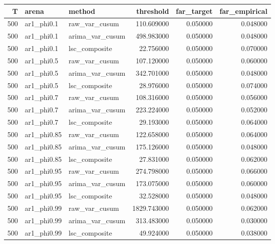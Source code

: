 \begin{tabular}{rllrrr}
\toprule
T & arena & method & threshold & far_target & far_empirical \\
\midrule
500 & ar1_phi0.1 & raw_var_cusum & 110.609000 & 0.050000 & 0.048000 \\
500 & ar1_phi0.1 & arima_var_cusum & 498.983000 & 0.050000 & 0.048000 \\
500 & ar1_phi0.1 & lsc_composite & 22.756000 & 0.050000 & 0.070000 \\
500 & ar1_phi0.5 & raw_var_cusum & 107.120000 & 0.050000 & 0.060000 \\
500 & ar1_phi0.5 & arima_var_cusum & 342.701000 & 0.050000 & 0.048000 \\
500 & ar1_phi0.5 & lsc_composite & 28.976000 & 0.050000 & 0.074000 \\
500 & ar1_phi0.7 & raw_var_cusum & 108.316000 & 0.050000 & 0.056000 \\
500 & ar1_phi0.7 & arima_var_cusum & 223.224000 & 0.050000 & 0.052000 \\
500 & ar1_phi0.7 & lsc_composite & 29.193000 & 0.050000 & 0.064000 \\
500 & ar1_phi0.85 & raw_var_cusum & 122.658000 & 0.050000 & 0.064000 \\
500 & ar1_phi0.85 & arima_var_cusum & 175.126000 & 0.050000 & 0.048000 \\
500 & ar1_phi0.85 & lsc_composite & 27.831000 & 0.050000 & 0.062000 \\
500 & ar1_phi0.95 & raw_var_cusum & 274.798000 & 0.050000 & 0.066000 \\
500 & ar1_phi0.95 & arima_var_cusum & 173.075000 & 0.050000 & 0.060000 \\
500 & ar1_phi0.95 & lsc_composite & 32.528000 & 0.050000 & 0.048000 \\
500 & ar1_phi0.99 & raw_var_cusum & 1829.743000 & 0.050000 & 0.062000 \\
500 & ar1_phi0.99 & arima_var_cusum & 313.483000 & 0.050000 & 0.030000 \\
500 & ar1_phi0.99 & lsc_composite & 49.924000 & 0.050000 & 0.038000 \\
\bottomrule
\end{tabular}
